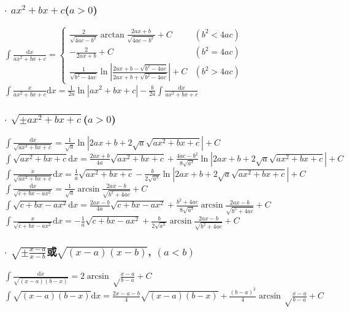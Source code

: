 \newcommand{\md}{\mathrm{d}}
\newcommand{\me}{\mathrm{e}}

\begin{footnotesize}

\subsubsection*{$\cdot$ $ax^2+bx+c$($a>0$)}

$ \int \frac{\md x}{ax^2+bx+c} = \begin{cases}
\frac{2}{\sqrt{4ac-b^2}}\arctan\frac{2ax+b}{\sqrt{4ac-b^2}} + C & (b^2 < 4ac) \\
 -\frac{2}{2ax+b} + C & (b^2 = 4ac) \\
\frac{1}{\sqrt{b^2-4ac}}\ln\left| \frac{2ax+b-\sqrt{b^2-4ac}}{2ax+b+\sqrt{b^2-4ac}} \right| + C & (b^2 > 4ac)
\end{cases} $
\\ $ \int \frac{x}{ax^2+bx+c} \md x = \frac{1}{2a} \ln |ax^2+bx+c| - \frac{b}{2a} \int \frac{\md x}{ax^2+bx+c} $

\subsubsection*{$\cdot$ $\sqrt{\pm ax^2+bx+c}$($a>0$)}

$ \int \frac{\md x}{\sqrt{ax^2+bx+c}} = \frac{1}{\sqrt{a}} \ln | 2ax+b+2\sqrt{a}\sqrt{ax^2+bx+c} | + C $
\\ $ \int \sqrt{ax^2+bx+c} \md x = \frac{2ax+b}{4a}\sqrt{ax^2+bx+c} +
	\frac{4ac-b^2}{8\sqrt{a^3}}\ln |2ax+b+2\sqrt{a}\sqrt{ax^2+bx+c}| + C $
\\ $ \int \frac{x}{\sqrt{ax^2+bx+c}} \md x = \frac{1}{a}\sqrt{ax^2+bx+c} -
	\frac{b}{2\sqrt{a^3}}\ln | 2ax+b+2\sqrt{a}\sqrt{ax^2+bx+c} | + C $
\\ $ \int \frac{\md x}{\sqrt{c+bx-ax^2}} = \frac{1}{\sqrt{a}} \arcsin \frac{2ax-b}{\sqrt{b^2+4ac}} + C  $
\\ $ \int \sqrt{c+bx-ax^2} \md x = \frac{2ax-b}{4a}\sqrt{c+bx-ax^2} +
	\frac{b^2+4ac}{8\sqrt{a^3}}\arcsin\frac{2ax-b}{\sqrt{b^2+4ac}} + C $
\\ $ \int \frac{x}{\sqrt{c+bx-ax^2}} \md x = -\frac{1}{a}\sqrt{c+bx-ax^2} + \frac{b}{2\sqrt{a^3}}\arcsin\frac{2ax-b}{\sqrt{b^2+4ac}} + C $


\subsubsection*{$\cdot$ $\sqrt{\pm\frac{x-a}{x-b}}$或$\sqrt{(x-a)(x-b)}$, $(a<b)$}
$ \int \frac{\md x}{\sqrt{(x-a)(b-x)}} = 2\arcsin\sqrt\frac{x-a}{b-a} + C$
\\ $\int \sqrt{(x-a)(b-x)} \md x = \frac{2x-a-b}{4}\sqrt{(x-a)(b-x)} +
		\frac{(b-a)^2}{4}\arcsin\sqrt\frac{x-a}{b-a} + C$


\end{footnotesize}

